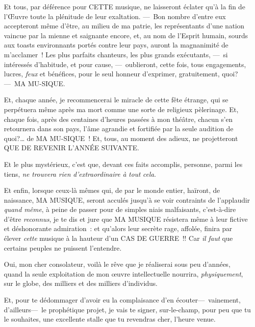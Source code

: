 \documentclass[french,twoside]{book} %
\begin{document}
Et tous, par déférence pour CETTE musique, ne laisseront éclater qu’à la fin de l’Œuvre   toute la plénitude de leur exaltation. — Bon nombre d’entre eux accepteront même d’être, au milieu de ma patrie, les représentants d’une nation vaincue par la mienne et saignante encore, et, au nom de l’Esprit humain, sourds aux toasts environnants portés contre leur pays, auront la magnanimité de m’acclamer ! Les plus parfaits chanteurs, les plus grands exécutants, — si intéressés d’habitude, et pour cause, — oublieront, cette fois, tous engagements, lucres, \emph{feux} et bénéfices, pour le seul honneur d’exprimer, gratuitement, quoi? — MA MU-SIQUE.\par
Et, chaque année, je recommencerai le miracle de cette fête étrange, qui se perpétuera même après ma mort comme une sorte de religieux pèlerinage. Et, chaque fois, après des centaines d’heures passées à mon théâtre, chacun s’en retournera dans son pays, l’âme agrandie et fortifiée par la seule audition de quoi?… de MA MU-SIQUE ! Et, tous, au moment des adieux, ne projetteront QUE DE REVENIR L’ANNÉE SUIVANTE.\par
Et le plus mystérieux, c’est que, devant ces   faits accomplis, personne, parmi les tiens, \emph{ne trouvera rien d’extraordinaire à tout cela}.\par
Et enfin, lorsque ceux-là mêmes qui, de par le monde entier, haïront, de naissance, MA MUSIQUE, seront acculés jusqu’à se voir contraints de l’applaudir \emph{quand même}, à peine de passer pour de simples niais malfaisants, c’est-à-dire d’être \emph{reconnus}, je te dis et jure que MA MUSIQUE résistera même à leur fictive et déshonorante admiration : et qu’alors leur secrète rage, affolée, finira par élever \emph{cette} musique à la hauteur d’un CAS DE GUERRE !! Car \emph{il faut} que certains peuples ne puissent l’entendre.\par
Oui, mon cher consolateur, voilà le rêve que je réaliserai sous peu d’années, quand la seule exploitation de mon œuvre intellectuelle nourrira, \emph{physiquement}, sur le globe, des milliers et des milliers d’individus.\par
Et, pour te dédommager d’avoir eu la complaisance d’en écouter— vainement, d’ailleurs— le prophétique projet, je vais te signer, sur-le-champ, pour peu que tu le souhaites, une excellente stalle que tu revendras cher, l’heure venue.\par
\end{document}
